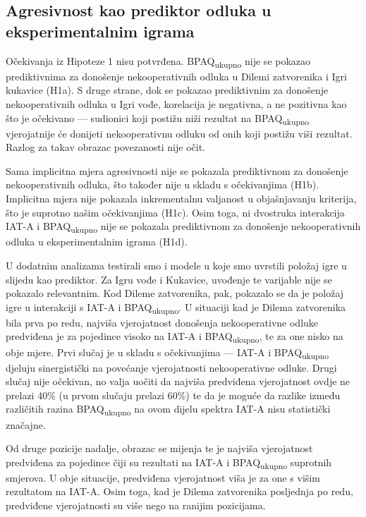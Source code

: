 \documentclass[a4paper, 12pt]{report}
\begin{document}
\subsection{Agresivnost kao prediktor odluka u eksperimentalnim igrama}

Očekivanja iz Hipoteze 1 nisu potvrđena. BPAQ\textsubscript{ukupno} 
nije se pokazao prediktivnima za donošenje nekooperativnih odluka u Dilemi
zatvorenika i Igri kukavice (H1a). S druge strane, dok se pokazao
prediktivnim za donošenje nekooperativnih odluka u Igri vođe, korelacija je
negativna, a ne pozitivna kao što je očekivano --- sudionici koji postižu niži
rezultat na BPAQ\textsubscript{ukupno} vjerojatnije će donijeti
nekooperativnu odluku od onih koji postižu viši rezultat.
Razlog za takav obrazac povezanosti nije očit. 

Sama implicitna mjera agresivnosti nije se pokazala prediktivnom za donošenje
nekooperativnih odluka, što također nije u skladu s očekivanjima (H1b).
Implicitna mjera nije pokazala inkrementalnu valjanost u objašnjavanju
kriterija, što je suprotno našim očekivanjima (H1c).
Osim toga, ni dvostruka interakcija IAT-A i BPAQ\textsubscript{ukupno} 
nije se pokazala prediktivnom za donošenje nekooperativnih odluka u
eksperimentalnim igrama (H1d).

U dodatnim analizama testirali smo i modele u 
koje smo uvrstili položaj igre u slijedu kao prediktor.
Za Igru vođe i Kukavice, uvođenje te varijable nije se pokazalo relevantnim. 
Kod Dileme zatvorenika, pak, pokazalo se da je položaj igre u
interakciji s IAT-A i BPAQ\textsubscript{ukupno}. U situaciji kad je
Dilema zatvorenika bila prva po redu, najviša vjerojatnost donošenja
nekooperativne odluke predviđena je za pojedince visoko na IAT-A i
BPAQ\textsubscript{ukupno}, te za one nisko na obje mjere. Prvi slučaj
je u skladu s očekivanjima --- IAT-A i BPAQ\textsubscript{ukupno}
djeluju sinergistički na povećanje vjerojatnosti nekooperativne odluke. Drugi
slučaj nije očekivan, no valja uočiti da najviša predviđena vjerojatnost ovdje ne
prelazi 40\% (u prvom slučaju prelazi 60\%) te da je moguće da razlike između
različitih razina BPAQ\textsubscript{ukupno} na ovom dijelu spektra
IAT-A nisu statistički značajne.

Od druge pozicije nadalje, obrazac se  mijenja te je najviša vjerojatnost
predviđena za pojedince čiji su rezultati na IAT-A i BPAQ\textsubscript{ukupno}
suprotnih smjerova. U obje situacije, predviđena vjerojatnost viša je
za one s višim rezultatom na IAT-A. Osim toga, kad je Dilema zatvorenika
posljednja po redu, predviđene vjerojatnosti su više nego na ranijim pozicijama.
\end{document}
